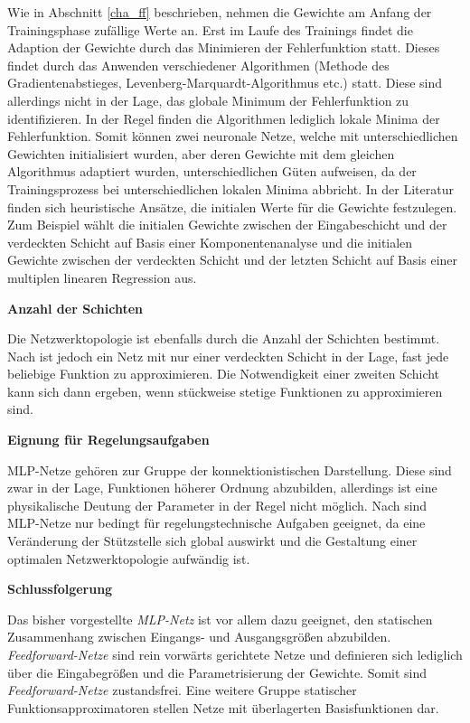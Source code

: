 Wie in Abschnitt \ref{cha_ff} beschrieben, nehmen die Gewichte am Anfang der Trainingsphase zufällige Werte an. Erst im Laufe des Trainings findet die Adaption der Gewichte durch das Minimieren der Fehlerfunktion statt. Dieses findet durch das Anwenden verschiedener Algorithmen (Methode des Gradientenabstieges, Levenberg-Marquardt-Algorithmus etc.) statt. Diese sind allerdings nicht in der Lage, das globale Minimum der Fehlerfunktion zu identifizieren. In der Regel finden die Algorithmen lediglich lokale Minima der Fehlerfunktion. Somit können zwei neuronale Netze, welche mit unterschiedlichen Gewichten initialisiert wurden, aber deren Gewichte mit dem gleichen Algorithmus adaptiert wurden, unterschiedlichen Güten aufweisen, da der Trainingsprozess bei unterschiedlichen lokalen Minima abbricht. In der Literatur finden sich heuristische Ansätze, die initialen Werte für die Gewichte festzulegen. Zum Beispiel wählt \cite{Piovoso.1991b} die initialen Gewichte zwischen der Eingabeschicht und der verdeckten Schicht auf Basis einer Komponentenanalyse und die initialen Gewichte zwischen der verdeckten Schicht und der letzten Schicht auf Basis einer multiplen linearen Regression aus. 

\textbf{Anzahl der Schichten}

Die Netzwerktopologie ist ebenfalls durch die Anzahl der Schichten bestimmt. Nach \cite{Hornik.1989} ist jedoch ein Netz mit nur einer verdeckten Schicht in der Lage, fast jede beliebige Funktion zu approximieren. Die Notwendigkeit einer zweiten Schicht kann sich dann ergeben, wenn stückweise stetige Funktionen zu approximieren sind.


\textbf{Eignung für Regelungsaufgaben}

MLP-Netze gehören zur Gruppe der konnektionistischen Darstellung. Diese sind zwar in der Lage, Funktionen höherer Ordnung abzubilden, allerdings ist eine physikalische Deutung der Parameter in der Regel nicht möglich. Nach \cite{Schroder.2010} sind MLP-Netze nur bedingt für regelungstechnische Aufgaben geeignet, da eine Veränderung der Stützstelle sich global auswirkt und die Gestaltung einer optimalen Netzwerktopologie aufwändig ist.



\textbf{Schlussfolgerung}

Das bisher vorgestellte \textit{MLP-Netz} ist vor allem dazu geeignet, den statischen Zusammenhang zwischen Eingangs- und Ausgangsgrößen abzubilden. \textit{Feedforward-Netze} sind rein vorwärts gerichtete Netze und definieren sich lediglich über die Eingabegrößen und die Parametrisierung der Gewichte. Somit sind \textit{Feedforward-Netze} zustandsfrei. Eine weitere Gruppe statischer Funktionsapproximatoren stellen Netze mit überlagerten Basisfunktionen dar.


